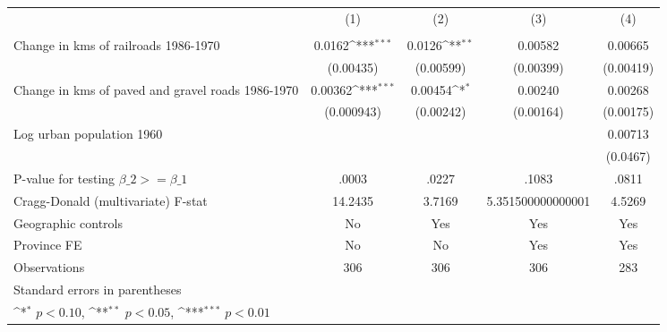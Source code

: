 {
\def\sym#1{\ifmmode^{#1}\else\(^{#1}\)\fi}
\begin{tabular}{l*{4}{c}}
\hline\hline
                &\multicolumn{1}{c}{(1)}&\multicolumn{1}{c}{(2)}&\multicolumn{1}{c}{(3)}&\multicolumn{1}{c}{(4)}\\
                &\multicolumn{1}{c}{}&\multicolumn{1}{c}{}&\multicolumn{1}{c}{}&\multicolumn{1}{c}{}\\
\hline
Change in kms of railroads 1986-1970&   0.0162\sym{***}&   0.0126\sym{**} &  0.00582         &  0.00665         \\
                &(0.00435)         &(0.00599)         &(0.00399)         &(0.00419)         \\
[1em]
Change in kms of paved and gravel roads 1986-1970&  0.00362\sym{***}&  0.00454\sym{*}  &  0.00240         &  0.00268         \\
                &(0.000943)         &(0.00242)         &(0.00164)         &(0.00175)         \\
[1em]
Log urban population 1960&                  &                  &                  &  0.00713         \\
                &                  &                  &                  & (0.0467)         \\
\hline
P-value for testing $\beta\_{2} >= \beta\_{1}$&    .0003         &    .0227         &    .1083         &    .0811         \\
Cragg-Donald (multivariate) F-stat&  14.2435         &   3.7169         &5.351500000000001         &   4.5269         \\
Geographic controls&       No         &      Yes         &      Yes         &      Yes         \\
Province FE     &       No         &       No         &      Yes         &      Yes         \\
Observations    &      306         &      306         &      306         &      283         \\
\hline\hline
\multicolumn{5}{l}{\footnotesize Standard errors in parentheses}\\
\multicolumn{5}{l}{\footnotesize \sym{*} \(p<0.10\), \sym{**} \(p<0.05\), \sym{***} \(p<0.01\)}\\
\end{tabular}
}
